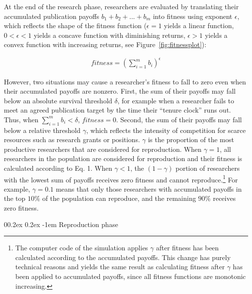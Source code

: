 \documentclass[british,,man,floatsintext]{apa6}
\makeatletter
\renewcommand{\paragraph}{\@startsection{paragraph}{4}{\parindent}%
  {0\baselineskip \@plus 0.2ex \@minus 0.2ex}%
  {-1em}%
  {\normalfont\normalsize\bfseries\itshape\typesectitle}}
\makeatother
\begin{document}
At the end of the research phase, researchers are evaluated by translating their accumulated publication payoffs \(b_1 + b_2 + ... + b_m\) into fitness using exponent \(\epsilon\), which reflects the shape of the fitness function (\(\epsilon = 1\) yields a linear function, \(0 < \epsilon < 1\) yields a concave function with diminishing returns, \(\epsilon > 1\) yields a convex function with increasing returns, see Figure~\ref{fig:fitnessplot}):

\begin{align}
fitness = (\sum_{i=1}^{m} b_i)^\epsilon
\end{align}

However, two situations may cause a researcher's fitness to fall to zero even when their accumulated payoffs are nonzero.
First, the sum of their payoffs may fall below an absolute survival threshold \(\delta\), for example when a researcher fails to meet an agreed publication target by the time their \enquote{tenure clock} runs out.
Thus, when \(\sum_{i=1}^{m} b_i < \delta\), \(fitness = 0\).
Second, the sum of their payoffs may fall below a relative threshold \(\gamma\), which reflects the intensity of competition for scarce resources such as research grants or positions.
\(\gamma\) is the proportion of the most productive researchers that are considered for reproduction.
When \(\gamma = 1\), all researchers in the population are considered for reproduction and their fitness is calculated according to Eq. 1.
When \(\gamma < 1\), the \((1 - \gamma)\) portion of researchers with the lowest sum of payoffs receives zero fitness and cannot reproduce.\footnote{The computer code of the simulation applies \(\gamma\) after fitness has been calculated according to the accumulated payoffs. This change has purely technical reasons and yields the same result as calculating fitness after \(\gamma\) has been applied to accumulated payoffs, since all fitness functions are monotonic increasing.}
For example, \(\gamma = 0.1\) means that only those researchers with accumulated payoffs in the top \(10\%\) of the population can reproduce, and the remaining \(90\%\) receives zero fitness.

\hypertarget{reproduction-phase}{%
\paragraph{Reproduction phase}\label{reproduction-phase}}
\end{document}
